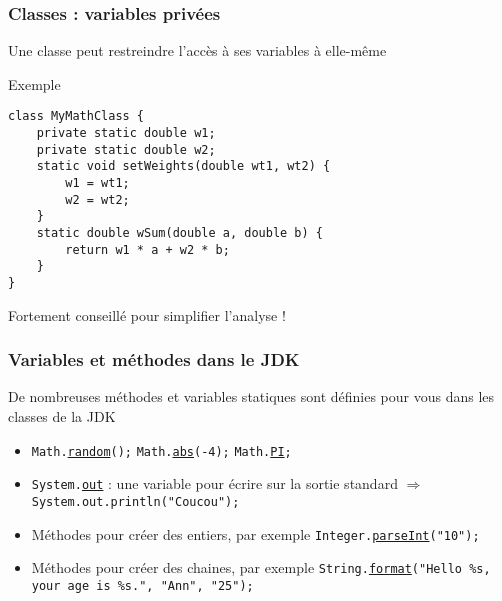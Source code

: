 \documentclass[english, french]{beamer}
\begin{document}
\begin{frame}[fragile]
	\frametitle{Classes : variables privées}
	Une classe peut restreindre l’accès à ses variables à elle-même
	\begin{block}{Exemple}
		\begin{lstlisting}
class MyMathClass {
	private static double w1;
	private static double w2;
	static void setWeights(double wt1, wt2) {
		w1 = wt1;
		w2 = wt2;
	}
	static double wSum(double a, double b) {
		return w1 * a + w2 * b;
	}
}
		\end{lstlisting}	
	\end{block}
	Fortement conseillé pour simplifier l’analyse !
\end{frame}

\begin{frame}
	\frametitle{Variables et méthodes dans le JDK}
	De nombreuses méthodes et variables statiques sont définies pour vous dans les classes de la JDK
	\begin{itemize}
		\item \texttt{Math.\href{https://docs.oracle.com/en/java/javase/11/docs/api/java.base/java/lang/Math.html\#random()}{random}();}
			\texttt{Math.\href{https://docs.oracle.com/en/java/javase/11/docs/api/java.base/java/lang/Math.html\#abs(double)}{abs}(-4);}
			\texttt{Math.\href{https://docs.oracle.com/en/java/javase/11/docs/api/java.base/java/lang/Math.html\#PI}{PI};}
		\item \texttt{System.\href{https://docs.oracle.com/en/java/javase/11/docs/api/java.base/java/lang/System.html\#out}{out}} : une variable pour écrire sur la sortie standard $⇒$ \texttt{System.out.println("Coucou");}
		\item Méthodes pour créer des entiers, par exemple \texttt{Integer.\href{https://docs.oracle.com/en/java/javase/11/docs/api/java.base/java/lang/Integer.html\#parseInt(java.lang.String)}{parseInt}("10");}
		\item Méthodes pour créer des chaines, par exemple \texttt{String.\href{https://docs.oracle.com/en/java/javase/11/docs/api/java.base/java/lang/String.html\#format(java.lang.String,java.lang.Object...)}{format}("Hello \%s, your age is \%s.", "Ann", "25");}
	\end{itemize}
\end{frame}
\end{document}
